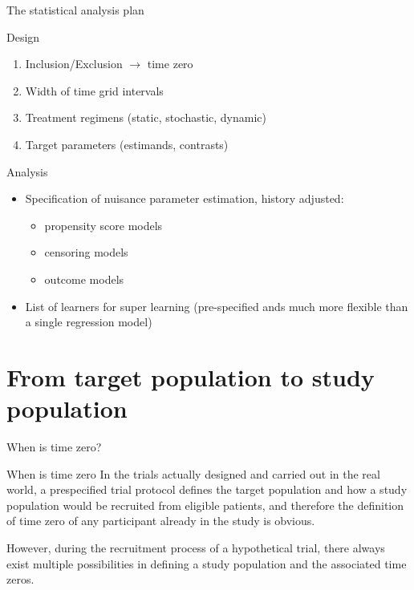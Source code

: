 \documentclass{beamer}\usepackage{listings}
\begin{document}
\begin{frame}[label={sec:org3083828}]{The statistical analysis plan}
\begin{block}{Design}
\begin{enumerate}
\item Inclusion/Exclusion \(\rightarrow\) time zero
\item Width of time grid intervals
\item Treatment regimens (static, stochastic, dynamic)
\item Target parameters (estimands, contrasts)
\end{enumerate}
\end{block}

\begin{block}{Analysis}
\begin{itemize}
\item Specification of nuisance parameter estimation, history adjusted:
\begin{itemize}
\item propensity score models
\item censoring models
\item outcome models
\end{itemize}
\item List of learners for super learning (pre-specified ands much more
flexible than a single regression model)
\end{itemize}
\end{block}
\end{frame}

\section{From target population to study population}
\label{sec:orgf2d9620}


\begin{frame}[label={sec:orgd56e057}]{}
\huge \color{white}

When is time zero?
\end{frame}


\begin{frame}[label={sec:org8a81169}]{When is time zero}
In the trials actually designed and carried out in the \alert{real world}, a
prespecified trial protocol defines the target population and how a
study population would be recruited from eligible patients, and
therefore the definition of time zero of any participant already in
the study is obvious.  \vfill

However, during the recruitment process of a \alert{hypothetical
trial}, there always exist multiple possibilities in defining a study
population and the associated time zeros.
\end{frame}
\end{document}
